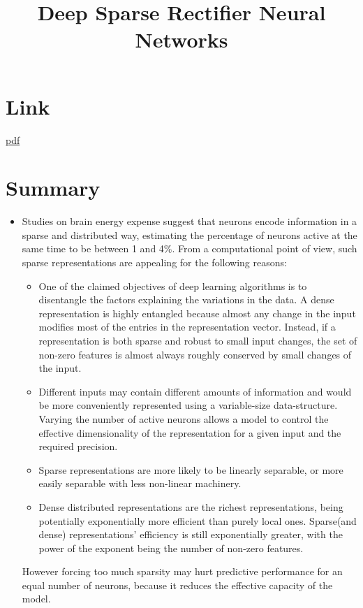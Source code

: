 \documentclass{article}
\title{Deep Sparse Rectifier Neural Networks}
\author{}
\date{}
\begin{document}
\maketitle

\section*{Link}
\href{http://proceedings.mlr.press/v15/glorot11a/glorot11a.pdf}{pdf} 

\section*{Summary}
\begin{itemize}
    \item Studies on brain energy expense suggest that neurons encode information in a sparse and distributed way, estimating the percentage of neurons active at the same time to be between 1 and 4\%. From a computational point of view, such sparse representations are appealing for the following reasons:  
    \begin{itemize}
        \item One of the claimed objectives of deep learning algorithms is to disentangle the factors explaining the variations in the data. A dense representation is highly entangled because almost any change in the input modifies most of the entries in the representation vector. Instead, if a representation is both sparse and robust to small input changes, the set of non-zero features is almost always roughly conserved by small changes of the input.
        \item Different inputs may contain different amounts of information and would be more conveniently represented using a variable-size data-structure. Varying the number of active neurons allows a model to control the effective dimensionality of the representation for a given input and the required precision.
        \item Sparse representations are  more likely to be linearly separable, or more easily separable with less non-linear machinery.
        \item Dense distributed representations are the richest representations, being potentially exponentially more efficient than purely local ones. Sparse(and dense) representations’ efficiency is still exponentially greater, with the power of the exponent being the number of non-zero features.
    \end{itemize}
    However forcing too much sparsity may hurt predictive performance for an equal number of neurons, because it reduces the effective capacity of the model.

\end{itemize}
\end{document}
